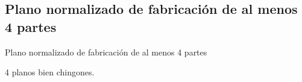 \subsection{Plano normalizado de fabricaci\'on de al menos 4 partes}
\label{Plano_normalizado}

Plano normalizado de fabricaci\'on de al menos 4 partes

4 planos bien chingones.